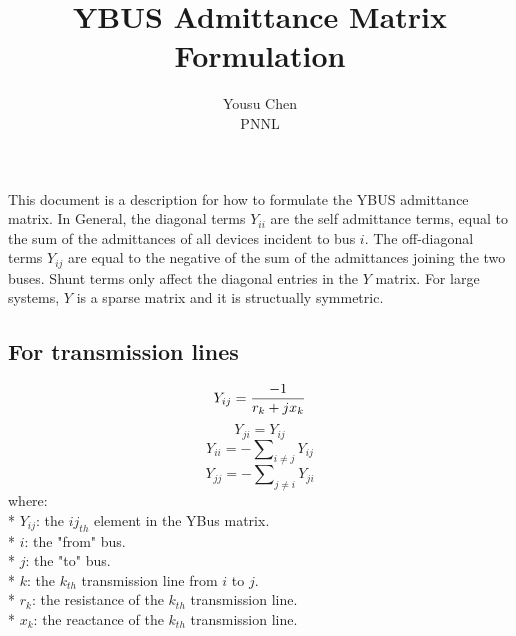 \documentclass[12pt]{article}
\begin{document}
\title{YBUS Admittance Matrix Formulation}
\author{Yousu Chen \\PNNL}
\maketitle
This document is a description for how to formulate the YBUS admittance matrix. In General, the diagonal terms $Y_{ii}$ are the self admittance terms, equal to the sum of the admittances of all devices incident to bus $i$.  The off-diagonal terms $Y_{ij}$ are equal to the negative of the sum of the admittances joining the two buses. Shunt terms only affect the diagonal entries in the $Y$ matrix. For large systems, $Y$ is a sparse matrix and it is structually symmetric. 

\subsection*{For transmission lines}
\begin{equation}
Y_{ij} = \frac{-1}{r_{k}+j\*x_{k}}
\end{equation} 
\begin{equation}
Y_{ji} = Y_{ij}
\end{equation} 
\begin{equation}
Y_{ii} = - \sum\nolimits_{i\ne j} Y_{ij} 
\end{equation} 
\begin{equation}
Y_{jj} = - \sum\nolimits_{j\ne i} Y_{ji}
\end{equation} 
where:\\*
$Y_{ij}$: the ${ij}_{th}$ element in the YBus matrix.\\* 
$i$: the "from" bus.\\*
$j$: the "to" bus. \\*
$k$: the $k_{th}$ transmission line from $i$ to $j$. \\*
$r_{k}$: the resistance of the $k_{th}$ transmission line.\\*
$x_{k}$: the reactance of the $k_{th}$ transmission line.
\end{document}
